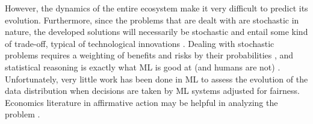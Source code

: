     However, the dynamics of the entire ecosystem make it very difficult to predict its evolution.
    Furthermore, since the problems that are dealt with are stochastic in nature, the developed solutions will necessarily be stochastic and entail some kind of trade-off, typical of technological innovations \cite{Hardin1989}.
    Dealing with stochastic problems requires a weighting of benefits and risks by their probabilities \cite{Hardin1989}, and statistical reasoning is exactly what ML is good at (and humans are not) \cite{Williamson2021}.
    Unfortunately, very little work has been done in ML to assess the evolution of the data distribution when decisions are taken by ML systems adjusted for fairness.
    Economics literature in affirmative action may be helpful in analyzing the problem \cite{Chouldechova2020}.
